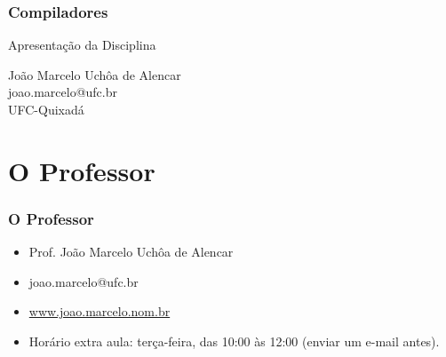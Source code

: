 \documentclass[table]{beamer}
\begin{document}
\begin{frame}
   \frametitle{Compiladores}
   \large
   \begin{center}
      Apresentação da Disciplina 
   \end{center}
   \scriptsize
   \begin{center}
      João Marcelo Uchôa de Alencar \\
      joao.marcelo@ufc.br \\
      UFC-Quixadá
   \end{center}
\end{frame}

\begin{frame}
   \tableofcontents
\end{frame}

\section{O Professor}
\begin{frame}
   \frametitle{O Professor}
   \begin{itemize}
      \item Prof. João Marcelo Uchôa de Alencar
      \item joao.marcelo@ufc.br
      \item \url{www.joao.marcelo.nom.br}
      \item Horário extra aula: terça-feira, das 10:00 às 12:00 (enviar um e-mail antes).
   \end{itemize}
\end{frame}
\end{document}
